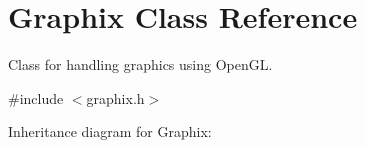\hypertarget{classGraphix}{}\section{Graphix Class Reference}
\label{classGraphix}


Class for handling graphics using Open\+GL.  




{\ttfamily \#include $<$graphix.\+h$>$}



Inheritance diagram for Graphix\+:
